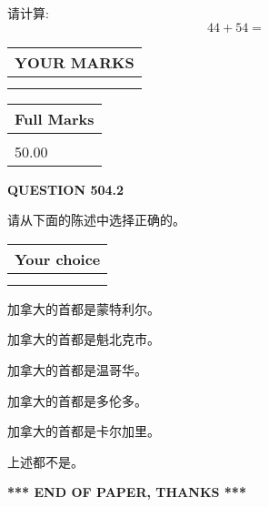 \documentclass{ctexart}
\begin{document}
  
 
请计算:
\begin{equation}
44 +  %
54 = \nonumber
\end{equation}
 

 

 
  
\vspace{0.2in}
  
\noindent\begin{tabular}{|l|}
\hline
 YOUR MARKS  \\
\hline
 \\ 
 \\ 
\hline
\end{tabular}
\hspace{0.05in} \begin{tabular}{|l|}
\hline
 Full Marks  \\
\hline
 \\ 
50.00 \\
\hline
\end{tabular}
{\textbf{\Large{QUESTION
504.2 
}}}
  
  
请从下面的陈述中选择正确的。
  
  
\noindent\hspace{3.0in} \begin{tabular}{|l|}
\hline
Your choice \\
\hline
 \\ 
 \\ 
\hline
\end{tabular}
  
  
 
 
加拿大的首都是蒙特利尔。
 
 
加拿大的首都是魁北克市。
 
 
加拿大的首都是温哥华。
 
 
加拿大的首都是多伦多。
 
 
加拿大的首都是卡尔加里。
 
 
 上述都不是。
 
 
   
   
 \vspace{0.2in}
 
   
   
   
   
\vspace{1.0in} 
{\textbf{\large{ *** END OF PAPER, THANKS *** }}} 
   
\end{document}
